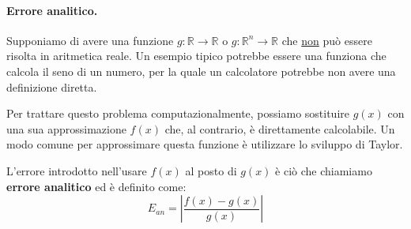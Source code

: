 \documentclass{article}
\begin{document}
\paragraph{Errore analitico.} Supponiamo di avere una funzione
$g:\mathbb{R}\rightarrow \mathbb{R}$ o $g:\mathbb{R}^n\rightarrow \mathbb{R}$
che \underline{non} può essere risolta in aritmetica reale. Un esempio tipico potrebbe essere
una funziona che calcola il seno di un numero, per la quale un calcolatore
potrebbe non avere una definizione diretta.

Per trattare questo problema computazionalmente, possiamo sostituire 
$g(x)$ con una sua approssimazione $f(x)$ che, al contrario, è direttamente
calcolabile. Un modo comune per approssimare questa funzione è utilizzare lo
sviluppo di Taylor.

L'errore introdotto nell'usare $f(x)$ al posto di $g(x)$ è ciò che chiamiamo
\textbf{errore analitico} ed è definito come:
$$E_{an}=\left\lvert \frac{f(x)-g(x)}{g(x)}\right\rvert$$
\end{document}
